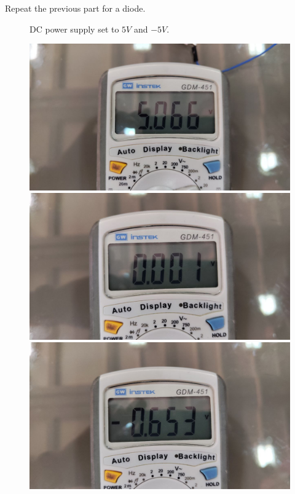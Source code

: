 \documentclass[11pt]{article}
\begin{document}
\begin{question}
\begin{subquestion}{Repeat the previous part for a diode.}
{\begin{figure}[H]
                \caption{DC power supply set to $5V$ and $-5V$.}
            \end{figure}
            \begin{figure}[H]
                \centering
                \includegraphics[scale=0.08,angle=0]{Fig/31.jpeg}
                \includegraphics[scale=0.08,angle=0]{Fig/32.jpeg}
                \includegraphics[scale=0.08,angle=0]{Fig/33.jpeg}

\end{figure}}
\end{subquestion}
\end{question}
\end{document}

